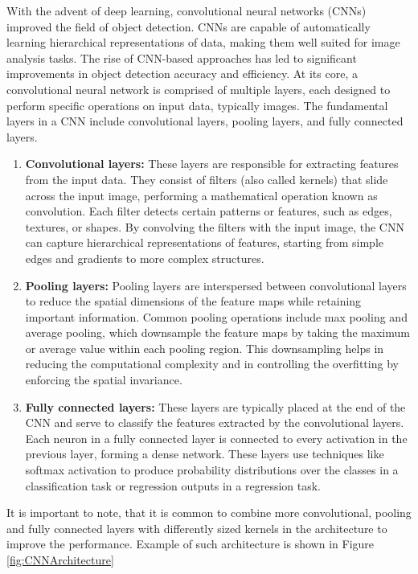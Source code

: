 With the advent of deep learning, convolutional neural networks (CNNs) improved the field of object detection. CNNs are
capable of automatically learning hierarchical representations of data, making them well suited for image analysis
tasks. The rise of CNN-based approaches has led to significant improvements in object detection accuracy and efficiency.
At its core, a convolutional neural network is comprised of multiple layers, each designed to perform specific operations on input data, typically images. The fundamental layers in a CNN include convolutional layers, pooling layers, and fully connected layers.
\begin{enumerate}
  \item \textbf{Convolutional layers:} These layers are responsible for extracting features from the input data. They consist of filters (also called kernels) that slide across the input image, performing a mathematical operation known as convolution. Each filter detects certain patterns or features, such as edges, textures, or shapes. By convolving the filters with the input image, the CNN can capture hierarchical representations of features, starting from simple edges and gradients to more complex structures.
  \item \textbf{Pooling layers:} Pooling layers are interspersed between convolutional layers to reduce the spatial dimensions of the feature maps while retaining important information. Common pooling operations include max pooling and average pooling, which downsample the feature maps by taking the maximum or average value within each pooling region. This downsampling helps in reducing the computational complexity and in controlling the overfitting by enforcing the spatial invariance.
  \item \textbf{Fully connected layers:} These layers are typically placed at the end of the CNN and serve to classify the features extracted by the convolutional layers. Each neuron in a fully connected layer is connected to every activation in the previous layer, forming a dense network. These layers use techniques like softmax activation to produce probability distributions over the classes in a classification task or regression outputs in a regression task.
\end{enumerate}
It is important to note, that it is common to combine more convolutional, pooling and fully connected layers with differently sized kernels in the architecture to improve the performance. Example of such architecture is shown in Figure \ref{fig:CNNArchitecture}
